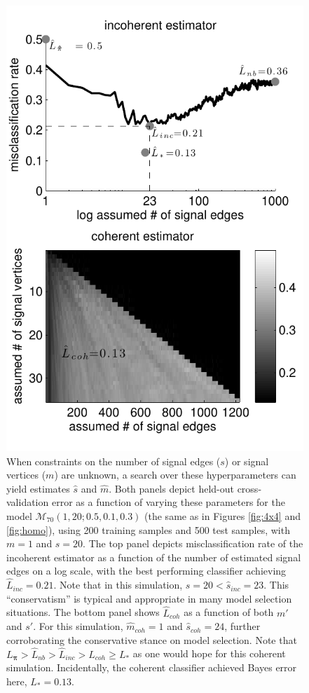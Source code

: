 \documentclass[10pt,journal,cspaper,compsoc]{IEEEtran}
\providecommand{\mc}[1]{\mathcal{#1}}
\providecommand{\mb}[1]{\boldsymbol{#1}}
\providecommand{\wh}[1]{\widehat{#1}}
\begin{document}
\begin{figure}[htbp]
	\centering
		\includegraphics[width=0.8\linewidth]{../figs/coherent_image_V70_s20_p10_q30_nTr200_nTe500.pdf}
	\caption{When constraints on the number of signal edges ($s$) or signal vertices ($m$) are unknown, a search over these hyperparameters can yield estimates $\wh{s}$ and $\wh{m}$.  Both panels depict held-out cross-validation error as a function of varying these parameters for the model 
	$\mc{M}_{70}(1,20;0.5,0.1,0.3)$
	(the same as in Figures \ref{fig:4x4} and \ref{fig:homo}), using 200 training samples and 500 test samples, with $m=1$ and $s=20$.  The top panel depicts misclassification rate of the incoherent estimator as a function of the number of estimated signal edges on a log scale, with the best performing classifier achieving $\wh{L}_{inc}=0.21$. Note that in this simulation,  $s=20< \wh{s}_{inc}=23$.  This ``conservatism'' is typical and appropriate in many model selection situations.  The bottom panel shows $\wh{L}_{coh}$ as a function of both $m'$ and $s'$.  For this simulation, $\wh{m}_{coh}=1$ and $\wh{s}_{coh}=24$, further corroborating the conservative stance on model selection. Note that $L_{\mb{\pi}} > \wh{L}_{nb} > \wh{L}_{inc} > \wh{L}_{coh} \geq L_*$ as one would hope for this coherent simulation.  Incidentally, the coherent classifier achieved Bayes error here, $L_*=0.13$.}
	\label{fig:coherent}
\end{figure}
\end{document}
